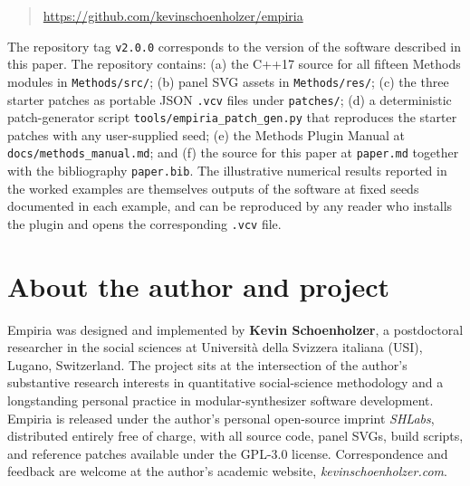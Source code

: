 \begin{quote}
\url{https://github.com/kevinschoenholzer/empiria}
\end{quote}

The repository tag \texttt{v2.0.0} corresponds to the version of the
software described in this paper. The repository contains: (a) the C++17
source for all fifteen Methods modules in \texttt{Methods/src/}; (b)
panel SVG assets in \texttt{Methods/res/}; (c) the three starter patches
as portable JSON \texttt{.vcv} files under \texttt{patches/}; (d) a
deterministic patch-generator script
\texttt{tools/empiria\_patch\_gen.py} that reproduces the starter
patches with any user-supplied seed; (e) the Methods Plugin Manual at
\texttt{docs/methods\_manual.md}; and (f) the source for this paper at
\texttt{paper.md} together with the bibliography \texttt{paper.bib}. The
illustrative numerical results reported in the worked examples are
themselves outputs of the software at fixed seeds documented in each
example, and can be reproduced by any reader who installs the plugin and
opens the corresponding \texttt{.vcv} file.

\section{About the author and
project}\label{about-the-author-and-project}

Empiria was designed and implemented by \textbf{Kevin Schoenholzer}, a
postdoctoral researcher in the social sciences at Università della
Svizzera italiana (USI), Lugano, Switzerland. The project sits at the
intersection of the author's substantive research interests in
quantitative social-science methodology and a longstanding personal
practice in modular-synthesizer software development. Empiria is
released under the author's personal open-source imprint \emph{SHLabs},
distributed entirely free of charge, with all source code, panel SVGs,
build scripts, and reference patches available under the GPL-3.0
license. Correspondence and feedback are welcome at the author's
academic website, \emph{kevinschoenholzer.com}.
